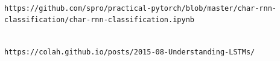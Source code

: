 \documentclass[runningheads]{llncs}
\begin{document}


\begin{thebibliography}

\\\texttt{https://github.com/spro/practical-pytorch/blob/master/char-rnn-classification/char-rnn-classification.ipynb}

\\\texttt{https://colah.github.io/posts/2015-08-Understanding-LSTMs/}

\end{thebibliography}
\end{document}
